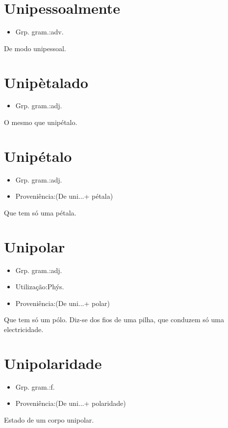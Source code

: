\documentclass{article}
\begin{document}
\section{Unipessoalmente}
\begin{itemize}
\item {Grp. gram.:adv.}
\end{itemize}
De modo unipessoal.
\section{Unipètalado}
\begin{itemize}
\item {Grp. gram.:adj.}
\end{itemize}
O mesmo que \textunderscore unipétalo\textunderscore .
\section{Unipétalo}
\begin{itemize}
\item {Grp. gram.:adj.}
\end{itemize}
\begin{itemize}
\item {Proveniência:(De \textunderscore uni...\textunderscore  + \textunderscore pétala\textunderscore )}
\end{itemize}
Que tem só uma pétala.
\section{Unipolar}
\begin{itemize}
\item {Grp. gram.:adj.}
\end{itemize}
\begin{itemize}
\item {Utilização:Phýs.}
\end{itemize}
\begin{itemize}
\item {Proveniência:(De \textunderscore uni...\textunderscore  + \textunderscore polar\textunderscore )}
\end{itemize}
Que tem só um pólo.
Diz-se dos fios de uma pilha, que conduzem só uma electricidade.
\section{Unipolaridade}
\begin{itemize}
\item {Grp. gram.:f.}
\end{itemize}
\begin{itemize}
\item {Proveniência:(De \textunderscore uni...\textunderscore  + \textunderscore polaridade\textunderscore )}
\end{itemize}
Estado de um corpo unipolar.
\end{document}
